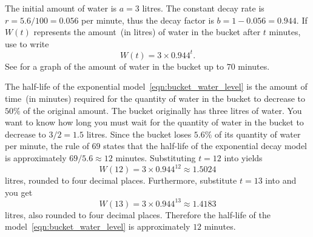 \documentclass[a4paper,oneside,12pt]{article}
\begin{document}
\begin{solution}
The initial amount of water is $a = 3$ litres.  The constant decay
rate is $r = 5.6 / 100 = 0.056$ per minute, thus the decay factor is
$b = 1 - 0.056 = 0.944$.  If $W(t)$ represents the amount~(in litres)
of water in the bucket after $t$ minutes, use
 to write
\begin{equation}
\label{eqn:bucket_water_level}
W(t)
=
3 \times 0.944^t.
\end{equation}
See  for a graph of the amount of water
in the bucket up to $70$ minutes.

The half-life of the exponential model~\eqref{eqn:bucket_water_level}
is the amount of time~(in minutes) required for the quantity of water
in the bucket to decrease to $50\%$ of the original amount.  The
bucket originally has three litres of water.  You want to know how
long you must wait for the quantity of water in the bucket to decrease
to $3 / 2 = 1.5$ litres.  Since the bucket loses $5.6\%$ of its
quantity of water per minute, the rule of $69$ states that the
half-life of the exponential decay model is approximately
$69 / 5.6 \approx 12$ minutes.  Substituting $t = 12$ into
 yields
\[
W(12)
=
3 \times 0.944^{12}
\approx
1.5024
\]
litres, rounded to four decimal places.  Furthermore, substitute
$t = 13$ into  and you get
\[
W(13)
=
3 \times 0.944^{13}
\approx
1.4183
\]
litres, also rounded to four decimal places.  Therefore the half-life
of the model~\eqref{eqn:bucket_water_level} is approximately $12$
minutes.
\end{solution}
\end{document}

